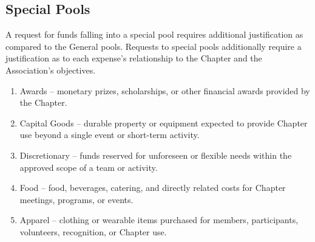 \subsection{Special Pools} \label{II.3}
A request for funds falling into a special pool requires additional justification as compared to the General pools. 
Requests to special pools additionally require a justification as to each expense’s relationship to the Chapter and the Association’s objectives.
\begin{enumerate}
    \item Awards – monetary prizes, scholarships, or other financial awards provided by the Chapter.
    \item Capital Goods – durable property or equipment expected to provide Chapter use beyond a single event or short-term activity.
    \item Discretionary – funds reserved for unforeseen or flexible needs within the approved scope of a team or activity.
    \item Food – food, beverages, catering, and directly related costs for Chapter meetings, programs, or events.
    \item Apparel – clothing or wearable items purchased for members, participants, volunteers, recognition, or Chapter use.
\end{enumerate}
